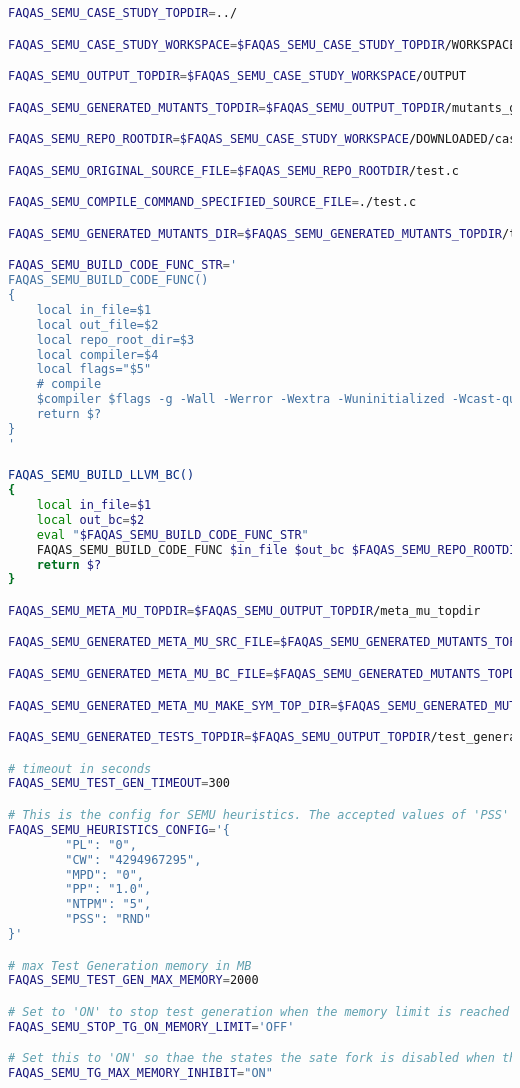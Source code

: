 \begin{lstlisting}[language=bash,label=listing:ASN:conf,caption=faqas\_semus\_conf.sh file for ASN case study.]
FAQAS_SEMU_CASE_STUDY_TOPDIR=../

FAQAS_SEMU_CASE_STUDY_WORKSPACE=$FAQAS_SEMU_CASE_STUDY_TOPDIR/WORKSPACE

FAQAS_SEMU_OUTPUT_TOPDIR=$FAQAS_SEMU_CASE_STUDY_WORKSPACE/OUTPUT

FAQAS_SEMU_GENERATED_MUTANTS_TOPDIR=$FAQAS_SEMU_OUTPUT_TOPDIR/mutants_generation

FAQAS_SEMU_REPO_ROOTDIR=$FAQAS_SEMU_CASE_STUDY_WORKSPACE/DOWNLOADED/casestudy

FAQAS_SEMU_ORIGINAL_SOURCE_FILE=$FAQAS_SEMU_REPO_ROOTDIR/test.c

FAQAS_SEMU_COMPILE_COMMAND_SPECIFIED_SOURCE_FILE=./test.c

FAQAS_SEMU_GENERATED_MUTANTS_DIR=$FAQAS_SEMU_GENERATED_MUTANTS_TOPDIR/test

FAQAS_SEMU_BUILD_CODE_FUNC_STR='
FAQAS_SEMU_BUILD_CODE_FUNC()
{
    local in_file=$1
    local out_file=$2
    local repo_root_dir=$3
    local compiler=$4
    local flags="$5"
    # compile
    $compiler $flags -g -Wall -Werror -Wextra -Wuninitialized -Wcast-qual -Wshadow -Wundef -fdiagnostics-show-option -D_DEBUG -I $repo_root_dir -O0 $in_file -o $out_file $flags
    return $?
}
'

FAQAS_SEMU_BUILD_LLVM_BC()
{
    local in_file=$1
    local out_bc=$2
    eval "$FAQAS_SEMU_BUILD_CODE_FUNC_STR"
    FAQAS_SEMU_BUILD_CODE_FUNC $in_file $out_bc $FAQAS_SEMU_REPO_ROOTDIR clang '-c -emit-llvm'
    return $?
}

FAQAS_SEMU_META_MU_TOPDIR=$FAQAS_SEMU_OUTPUT_TOPDIR/meta_mu_topdir

FAQAS_SEMU_GENERATED_META_MU_SRC_FILE=$FAQAS_SEMU_GENERATED_MUTANTS_TOPDIR/test.MetaMu.c

FAQAS_SEMU_GENERATED_META_MU_BC_FILE=$FAQAS_SEMU_GENERATED_MUTANTS_TOPDIR/test.MetaMu.bc

FAQAS_SEMU_GENERATED_META_MU_MAKE_SYM_TOP_DIR=$FAQAS_SEMU_GENERATED_MUTANTS_TOPDIR/"MakeSym-TestGen-Input"

FAQAS_SEMU_GENERATED_TESTS_TOPDIR=$FAQAS_SEMU_OUTPUT_TOPDIR/test_generation

# timeout in seconds
FAQAS_SEMU_TEST_GEN_TIMEOUT=300

# This is the config for SEMU heuristics. The accepted values of 'PSS' are 'RND' for random and 'MDO' for minimum distance to output
FAQAS_SEMU_HEURISTICS_CONFIG='{
        "PL": "0",
        "CW": "4294967295",
        "MPD": "0",
        "PP": "1.0",
        "NTPM": "5",
        "PSS": "RND"
}'

# max Test Generation memory in MB
FAQAS_SEMU_TEST_GEN_MAX_MEMORY=2000

# Set to 'ON' to stop test generation when the memory limit is reached
FAQAS_SEMU_STOP_TG_ON_MEMORY_LIMIT='OFF'

# Set this to 'ON' so thae the states the sate fork is disabled when the memory limit is reached, to avoid going much over it
FAQAS_SEMU_TG_MAX_MEMORY_INHIBIT="ON"
\end{lstlisting}

